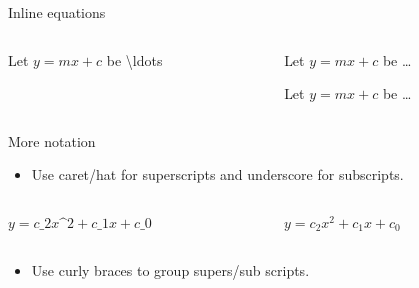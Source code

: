 \documentclass[,aspectratio=43]{beamer}
\newenvironment{Shaded}{\begin{snugshade}}{\end{snugshade}}
\newcommand{\FunctionTok}[1]{\textcolor[rgb]{0.02,0.16,0.49}{#1}}
\newcommand{\NormalTok}[1]{#1}
\newcommand{\SpecialStringTok}[1]{\textcolor[rgb]{0.73,0.40,0.53}{#1}}
\providecommand{\tightlist}{%
  \setlength{\itemsep}{0pt}\setlength{\parskip}{0pt}}
\begin{document}
\begin{frame}[fragile]{Inline equations}
\begin{columns}[T]
\begin{column}{0.48\textwidth}
\begin{Shaded}
\begin{Highlighting}[]
\NormalTok{Let }\SpecialStringTok{$y = m x + c$}\NormalTok{ be }\FunctionTok{\textbackslash{}ldots}
\end{Highlighting}
\end{Shaded}
\end{column}

\begin{column}{0.48\textwidth}
Let \(y=mx+c\) be \ldots

\vspace{1em}

Let \(y = m x + c\) be \ldots
\end{column}
\end{columns}
\end{frame}

\begin{frame}[fragile]{More notation}
\protect\hypertarget{more-notation}{}
\begin{itemize}
\tightlist
\item
  Use caret/hat \framebox{\ \texttt{\^}} for superscripts and underscore
  \framebox{$\vphantom{a}$\texttt{\_}} for subscripts.
\end{itemize}

\begin{columns}[T]
\begin{column}{0.58\textwidth}
\small
\vspace{-1em}

\begin{Shaded}
\begin{Highlighting}[]
\SpecialStringTok{$y = c\_2 x\^{}2 + c\_1 x + c\_0$}
\end{Highlighting}
\end{Shaded}
\end{column}

\begin{column}{0.38\textwidth}
\(y = c_2 x^2 + c_1 x + c_0\)
\end{column}
\end{columns}

\vspace{0.5em}

\begin{itemize}
\tightlist
\item
  Use curly braces \framebox{\texttt{\{}} \framebox{\texttt{\}}} to
  group supers/sub scripts.
\end{itemize}

\begin{columns}[T]
\begin{column}{0.58\textwidth}
\small
\vspace{-1em}


\end{column}
\end{columns}
\end{frame}
\end{document}
